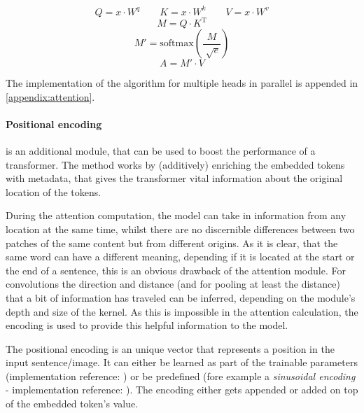 \begin{equation}
    \label{eq:attention-step-1}
    Q = x \cdot W^q \qquad K = x \cdot W^k \qquad V = x \cdot W^v
\end{equation}
\begin{equation}
    \label{eq:attention-step-2}
    M = Q\cdot K^\mathrm{T}
\end{equation}
\begin{equation}
    \label{eq:attention-step-3-4}
    M' = \mathrm{softmax}\left(\frac{M}{\sqrt[]{e}}\right)
\end{equation}
\begin{equation}
    \label{eq:attention-step-5}
    A = M' \cdot V
\end{equation}

The implementation of the algorithm for multiple heads in parallel is appended in \autoref{appendix:attention}.

\FloatBarrier
\paragraph{Positional encoding} is an additional module, that can be used to boost the performance of a transformer.
The method works by (additively) enriching the embedded tokens with \glqq metadata\grqq{}, that gives the transformer vital information about the original location of the tokens.

During the attention computation, the model can take in information from any location at the same time, whilst there are no discernible differences between two patches of the same content but from different origins.
As it is clear, that the same word can have a different meaning, depending if it is located at the start or the end of a sentence, this is an obvious drawback of the attention module. 
For convolutions the direction and distance (and for pooling at least the distance) that a bit of information has traveled can be inferred, depending on the module's depth and size of the kernel. 
As this is impossible in the attention calculation, the encoding is used to provide this helpful information to the model.

The positional encoding is an unique vector that represents a position in the input sentence/image.
It can either be learned as part of the trainable parameters (implementation reference: \cite{dinoGithub}) or be predefined (fore example a \emph{sinusoidal encoding} - implementation reference: \cite{positionalEncodingGithub}).
The encoding either gets appended or added on top of the embedded token's value.

